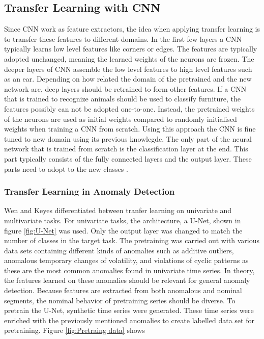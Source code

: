 \subsection{Transfer Learning with CNN}
Since CNN work as feature extractors, the idea when applying transfer learning is to transfer these features to different domains. In the first few layers a CNN typically learns low level features like corners or edges. The features are typically adopted unchanged, meaning the learned weights of the neurons are frozen. The deeper layers of CNN assemble the low level features to high level features such as an ear. Depending on how related the domain of the pretrained and the new network are, deep layers should be retrained to form other features. If a CNN that is trained to recognize animals should be used to classify furniture, the features possibly can not be adopted one-to-one. Instead, the pretrained weights of the neurons are used as initial weights compared to randomly initialised weights when training a CNN from scratch. Using this approach the CNN is fine tuned to new domain using its previous knowlegde. The only part of the neural network that is trained from scratch is the classification layer at the end. This part typically consists of the fully connected layers and the output layer. These parts need to adopt to the new classes \parencite{Chollet2018}. 

\subsubsection{Transfer Learning in Anomaly Detection} \label{TransferLearning}
Wen and Keyes \parencite*{Wen2019} differentiated between tranfer learning on univariate and multivariate tasks. For univariate tasks, the architecture, a U-Net, shown in figure \ref{fig:U-Net} was used. Only the output layer was changed to match the number of classes in the target task. The pretraining was carried out with various data sets containing different kinds of anomalies such as additive outliers, anomalous temporary changes of volatility,
and violations of cyclic patterns as these are the most common anomalies found in univariate time series. In theory, the features learned on these anomalies should be relevant for general anomaly detection. Because features are extracted from both anomalous and nominal segments, the nominal behavior of pretraining series should be diverse. To pretrain the U-Net, synthetic time series were generated. These time series were enriched with the previously mentioned anomalies to create labelled data set for pretraining. Figure \ref{fig:Pretraing data} shows 


